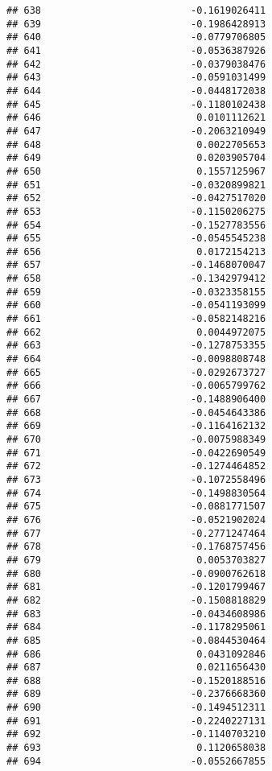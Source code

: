 \documentclass[
]{article}
\begin{document}
\begin{verbatim}
## 638                          -0.1619026411
## 639                          -0.1986428913
## 640                          -0.0779706805
## 641                          -0.0536387926
## 642                          -0.0379038476
## 643                          -0.0591031499
## 644                          -0.0448172038
## 645                          -0.1180102438
## 646                           0.0101112621
## 647                          -0.2063210949
## 648                           0.0022705653
## 649                           0.0203905704
## 650                           0.1557125967
## 651                          -0.0320899821
## 652                          -0.0427517020
## 653                          -0.1150206275
## 654                          -0.1527783556
## 655                          -0.0545545238
## 656                           0.0172154213
## 657                          -0.1468070047
## 658                          -0.1342979412
## 659                          -0.0323358155
## 660                          -0.0541193099
## 661                          -0.0582148216
## 662                           0.0044972075
## 663                          -0.1278753355
## 664                          -0.0098808748
## 665                          -0.0292673727
## 666                          -0.0065799762
## 667                          -0.1488906400
## 668                          -0.0454643386
## 669                          -0.1164162132
## 670                          -0.0075988349
## 671                          -0.0422690549
## 672                          -0.1274464852
## 673                          -0.1072558496
## 674                          -0.1498830564
## 675                          -0.0881771507
## 676                          -0.0521902024
## 677                          -0.2771247464
## 678                          -0.1768757456
## 679                           0.0053703827
## 680                          -0.0900762618
## 681                          -0.1201799467
## 682                          -0.1508818829
## 683                          -0.0434608986
## 684                          -0.1178295061
## 685                          -0.0844530464
## 686                           0.0431092846
## 687                           0.0211656430
## 688                          -0.1520188516
## 689                          -0.2376668360
## 690                          -0.1494512311
## 691                          -0.2240227131
## 692                          -0.1140703210
## 693                           0.1120658038
## 694                          -0.0552667855

\end{verbatim}
\end{document}
